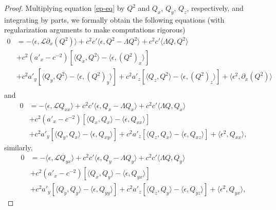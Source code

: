 \documentclass[12pt,letterpaper]{amsart}
\newcommand{\la}{\langle}
\newcommand{\ra}{\rangle}
\theoremstyle{remark}
\numberwithin{equation}{section}
\numberwithin{theorem}{section}
\numberwithin{table}{section}
\begin{document}

\begin{proof}
Multiplying equation \eqref{ep-eq} by $Q^2$ and $Q_{x}$, $Q_{y}$, $Q_{z}$, respectively, and integrating by parts, we formally obtain the following equations (with regularization arguments to make computations rigorous)
\begin{align*}
0 &=  -\la \epsilon, \mathcal{L} \partial_{x} (Q^2)\ra + c^2c' \la \epsilon, Q^2-\Lambda Q^2\ra +c^2c' \la \Lambda Q, Q^2\ra\\
&+c^2(a'_{x} -c^{-2}) \left[\la Q_{x},Q^2\ra-\la \epsilon, (Q^2)_{x}\ra\right]\\
&+c^2a'_{y} \left[\la Q_{y},Q^2\ra-\la \epsilon, (Q^2)_{y}\ra\right]+c^2a'_{z} \left[\la Q_{z},Q^2\ra-\la \epsilon, (Q^2)_{z}\ra\right] +\la \epsilon^2, \partial_{x}(Q^2)\ra\\
\end{align*}
and
\begin{align*}
0 &=  -\la \epsilon, \mathcal{L}  Q_{xx}\ra + c^2c' \la \epsilon, Q_{x}-\Lambda Q_{x}\ra +c^2c' \la \Lambda Q, Q_{x}\ra\\
&+c^2(a'_{x} -c^{-2}) \left[\la Q_{x},Q_{x}\ra-\la \epsilon, Q_{xx}\ra\right]\\
&+c^2a'_{y} \left[\la Q_{y},Q_{x}\ra-\la \epsilon, Q_{xy}\ra\right]+c^2a'_{z} \left[\la Q_{z},Q_{x}\ra-\la \epsilon, Q_{xz}\ra\right] +\la \epsilon^2, Q_{xx}\ra, %
\end{align*}
similarly, 
\begin{align*}
0 &=  -\la \epsilon, \mathcal{L}  Q_{yx}\ra + c^2c' \la \epsilon, Q_{y}-\Lambda Q_{y}\ra 
+c^2c' \la \Lambda Q, Q_{y}\ra\\
&+c^2(a'_{x} -c^{-2}) \left[\la Q_{x},Q_{y}\ra-\la \epsilon, Q_{yx}\ra\right]\\
&+c^2a'_{y} \left[\la Q_{y},Q_{y}\ra-\la \epsilon, Q_{yy}\ra\right]+c^2a'_{z} \left[\la Q_{z},Q_{y}\ra-\la \epsilon, Q_{yz}\ra\right] +\la \epsilon^2, Q_{yx}\ra, %

\end{align*}
\end{proof}
\end{document}
